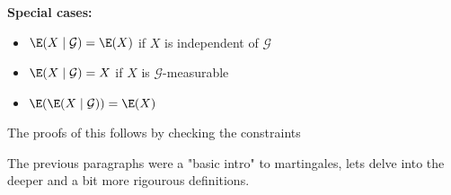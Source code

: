 \par\bigskip
\noindent\textbf{Special cases:}\par
\begin{itemize}
  \item $\E(X\mid\mathcal{G}) = \E(X)$ if $X$ is independent of $\mathcal{G}$
  \item $\E(X\mid\mathcal{G}) = X$ if $X$ is $\mathcal{G}$-measurable
  \item $\E(\E(X\mid\mathcal{G})) = \E(X)$
\end{itemize}\par
\noindent The proofs of this follows by checking the constraints
\par\bigskip
\noindent The previous paragraphs were a "basic intro" to martingales, lets delve into the deeper and a bit more rigourous definitions.
\par\bigskip
